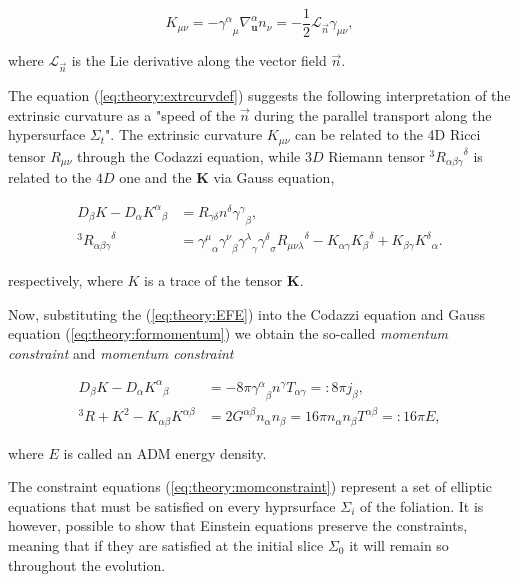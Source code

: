 \documentclass[11pt,a4paper,headinclude=true,DIV=14,BCOR=8mm,chapterprefix,listof=totoc,twoside,openright,abstracton]{scrbook}
\begin{document}
\begin{equation}
K_{\mu\nu} = -{\gamma^{\alpha}}_{\mu}\nabla_{\boldsymbol{u}}^{\alpha} n_{\nu} = -\frac{1}{2}\mathcal{L}_{\vec{n}}\gamma_{\mu\nu},
\label{eq:theory:extrcurvdef}
\end{equation}

where $\mathcal{L}_{\vec{n}}$ is the Lie derivative along the vector field $\vec{n}$. 

The equation (\ref{eq:theory:extrcurvdef}) suggests the following interpretation of the  extrinsic curvature as a "speed of the $\vec{n}$ during the parallel transport along the hypersurface $\Sigma_t$". The extrinsic curvature $K_{\mu\nu}$ can be related to the 4D Ricci tensor $R_{\mu\nu}$ through the Codazzi equation, while $3D$ Riemann tensor $^3{R_{\alpha\beta\gamma}}^{\delta}$ is related to the $4D$ one and the $\boldsymbol{K}$ via Gauss equation,

\begin{align}
D_{\beta}K-D_{\alpha}{K^{\alpha}}_{\beta} &= R_{\gamma\delta}n^{\delta}{\gamma^{\gamma}}_{\beta},\\
^3{R_{\alpha\beta\gamma}}^{\delta} &= {\gamma^{\mu}}_{\alpha}{\gamma^{\nu}}_{\beta}{\gamma^{\lambda}}_{\gamma}{\gamma^{\delta}}_{\sigma}{R_{\mu\nu\lambda}}^{\delta}-K_{\alpha\gamma}{K_{\beta}}^{\delta}+K_{\beta\gamma}{K^{\delta}}_{\alpha}.
\label{eq:theory:formomentum}
\end{align}

respectively, where $K$ is a trace of the tensor $\boldsymbol{K}$. 

Now, substituting the (\ref{eq:theory:EFE}) into the Codazzi equation and Gauss equation (\ref{eq:theory:formomentum}) we obtain the so-called \textit{momentum constraint} and \textit{momentum constraint}

\begin{align}
    D_{\beta}K-D_{\alpha}{K^{\alpha}}_{\beta} &= -8\pi{\gamma^{\alpha}}_{\beta} n^{\gamma}T_{\alpha\gamma}=:8\pi j_{\beta}, \\
    ^3 R+ K^2 - K_{\alpha\beta}K^{\alpha\beta} &= 2G^{\alpha\beta}n_{\alpha}n_{\beta} = 16\pi n_{\alpha}n_{\beta} T^{\alpha\beta} =: 16\pi E,
    \label{eq:theory:momconstraint}
\end{align}

where $E$ is called an ADM energy density. 

The constraint equations (\ref{eq:theory:momconstraint}) represent a set of elliptic equations that must be satisfied on every hyprsurface $\Sigma_i$ of the foliation. It is however, possible to show that Einstein equations preserve the constraints, meaning that if they are satisfied at the initial slice $\Sigma_0$ it will remain so throughout the evolution. 
\end{document}
